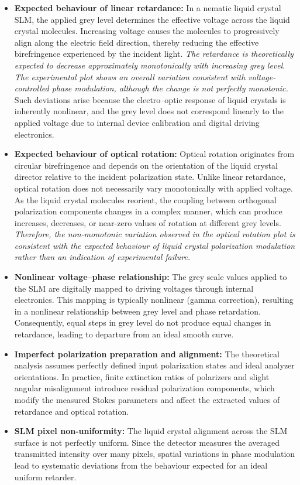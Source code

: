 \begin{itemize}
    \item \textbf{Expected behaviour of linear retardance:} In a nematic liquid crystal SLM, the applied grey level determines the effective voltage across the liquid crystal molecules. Increasing voltage causes the molecules to progressively align along the electric field direction, thereby reducing the effective birefringence experienced by the incident light. \emph{The retardance is theoretically expected to decrease approximately monotonically with increasing grey level}. \emph{The experimental plot shows an overall variation consistent with voltage-controlled phase modulation, although the change is not perfectly monotonic.} Such deviations arise because the electro--optic response of liquid crystals is inherently nonlinear, and the grey level does not correspond linearly to the applied voltage due to internal device calibration and digital driving electronics.
    \item \textbf{Expected behaviour of optical rotation:} Optical rotation originates from circular birefringence and depends on the orientation of the liquid crystal director relative to the incident polarization state. Unlike linear retardance, optical rotation does not necessarily vary monotonically with applied voltage. As the liquid crystal molecules reorient, the coupling between orthogonal polarization components changes in a complex manner, which can produce increases, decreases, or near-zero values of rotation at different grey levels. \emph{Therefore, the non-monotonic variation observed in the optical rotation plot is consistent with the expected behaviour of liquid crystal polarization modulation rather than an indication of experimental failure.}
    \item \textbf{Nonlinear voltage--phase relationship:} The grey scale values applied to the SLM are digitally mapped to driving voltages through internal electronics. This mapping is typically nonlinear (gamma correction), resulting in a nonlinear relationship between grey level and phase retardation. Consequently, equal steps in grey level do not produce equal changes in retardance, leading to departure from an ideal smooth curve.
    \item \textbf{Imperfect polarization preparation and alignment:} The theoretical analysis assumes perfectly defined input polarization states and ideal analyzer orientations. In practice, finite extinction ratios of polarizers and slight angular misalignment introduce residual polarization components, which modify the measured Stokes parameters and affect the extracted values of retardance and optical rotation.
    \item \textbf{SLM pixel non-uniformity: } The liquid crystal alignment across the SLM surface is not perfectly uniform. Since the detector measures the averaged transmitted intensity over many pixels, spatial variations in phase modulation lead to systematic deviations from the behaviour expected for an ideal uniform retarder.

\end{itemize}

